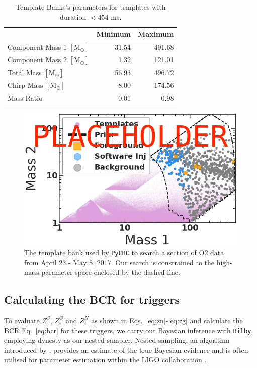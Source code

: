 \documentclass[%
preprint,
 amsmath,amssymb,
 aps,
]{revtex4}
\newcommand{\bilby}{{\sc \href{https://lscsoft.docs.ligo.org/bilby/}{\texttt{Bilby}}}\xspace}
\newcommand{\dynesty}{{\sc dynesty}\xspace}
\newcommand{\pycbc}{{\sc \href{https://pycbc.org/}{\texttt{PyCBC}}}\xspace}
\newcommand{\bcr}{{\sc BCR}\xspace}
\begin{document}
\begin{table}[t]

\caption[BBH parameters corresponding to durations $<454$ ms]{\label{tab:parameters}Template Banks's parameters for templates with duration $<454$ ms.}
\centering
\begin{tabular}{lrr}
\toprule
  & Minimum & Maximum\\
\midrule
Component Mass 1 $[\text{M}_{\odot}]$ & 31.54 & 491.68\\
Component Mass 2 $[\text{M}_{\odot}]$ & 1.32 & 121.01\\
Total Mass $[\text{M}_{\odot}]$ & 56.93 & 496.72\\
Chirp Mass $[\text{M}_{\odot}]$ & 8.00 & 174.56\\
Mass Ratio & 0.01 & 0.98\\
\end{tabular}
\end{table}





\begin{figure}[!h]

{\centering \includegraphics[width=0.75\linewidth]{images/template_bank_masses} 

}
\caption[High-mass BCR search space.]{The template bank used by \pycbc to search a section of O2 data from $\text{April 23 - May 8, 2017}$. Our search is constrained to the high-mass parameter space enclosed by the dashed line.}\label{fig:templateBank}
\end{figure}


\subsection{Calculating the BCR for triggers}
To evaluate $Z^S$, $Z^G_i$ and $Z^N_i$ as shown in Eqs.~\ref{eq:zn}-\ref{eq:zg} and calculate the \bcr Eq.~\ref{eq:bcr} for these triggers, we carry out Bayesian inference with \bilby \cite{bilby}, employing \dynesty \cite{dynesty} as our nested sampler. Nested sampling, an algorithm introduced by \cite{skilling_nested_sampling}, provides an estimate of the true Bayesian evidence and is often utilised for parameter estimation within the LIGO collaboration \cite{bilby}.\\ 
\end{document}
